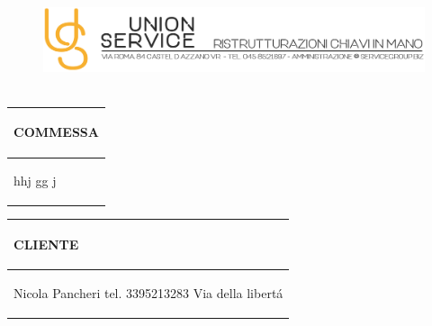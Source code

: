 \documentclass[a4paper]{article}
\begin{document}
                                \begin{figure}[!t]
                                \includegraphics[width=15.8cm, height=3cm]{intestazioneAlta2.jpg}
                                \end{figure}

                                \noindent\begin{tabular}{| L{72.2mm} |}
                                    \hline
                                    \vspace{2.5mm}
                                    \begin{spacing}{0}
                                    \textbf{COMMESSA}
                                    \end{spacing}\\
                                    \hline
                                    \vspace{4mm}
                                    \begin{spacing}{1.2}

                                hhj \newline gg \newline j
                                  \end{spacing}\\
                                    \hline
                                  \end{tabular}
                                  \quad
                                  \begin{tabular}{ | R{72.2mm} | }
                                    \hline
                                    \vspace{2.5mm}
                                    \begin{spacing}{0}
                                    \textbf{CLIENTE}
                                    \end{spacing}\\
                                    \hline
                                    \vspace{4mm}
                                    \begin{spacing}{1.2}

                               Nicola Pancheri \newline tel. 3395213283 \newline Via della libert\'a
                                  \end{spacing}\\
                                    \hline
                                  \end{tabular}
\end{document}

